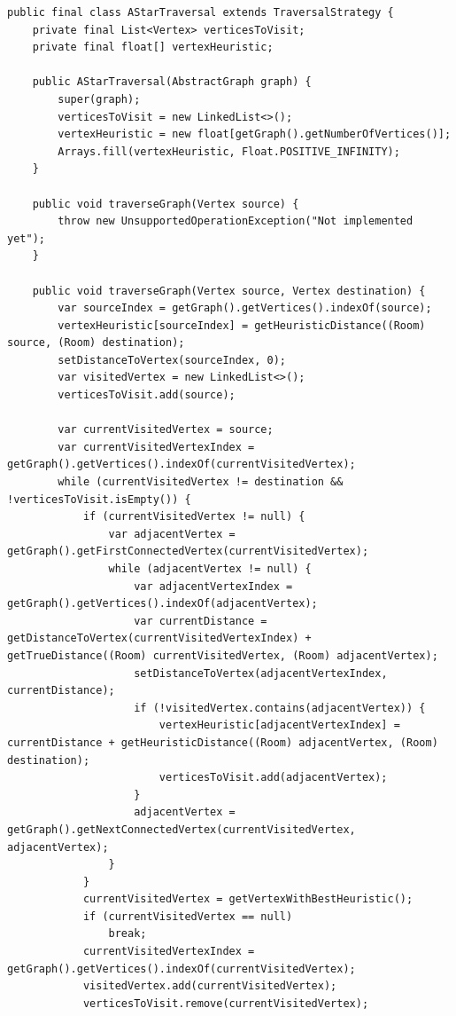 \documentclass[a4paper, 12pt]{article}
\begin{document}
\begin{verbatim}
public final class AStarTraversal extends TraversalStrategy {
    private final List<Vertex> verticesToVisit;
    private final float[] vertexHeuristic;

    public AStarTraversal(AbstractGraph graph) {
        super(graph);
        verticesToVisit = new LinkedList<>();
        vertexHeuristic = new float[getGraph().getNumberOfVertices()];
        Arrays.fill(vertexHeuristic, Float.POSITIVE_INFINITY);
    }

    public void traverseGraph(Vertex source) {
        throw new UnsupportedOperationException("Not implemented yet");
    }

    public void traverseGraph(Vertex source, Vertex destination) {
        var sourceIndex = getGraph().getVertices().indexOf(source);
        vertexHeuristic[sourceIndex] = getHeuristicDistance((Room) source, (Room) destination);
        setDistanceToVertex(sourceIndex, 0);
        var visitedVertex = new LinkedList<>();
        verticesToVisit.add(source);

        var currentVisitedVertex = source;
        var currentVisitedVertexIndex = getGraph().getVertices().indexOf(currentVisitedVertex);
        while (currentVisitedVertex != destination && !verticesToVisit.isEmpty()) {
            if (currentVisitedVertex != null) {
                var adjacentVertex = getGraph().getFirstConnectedVertex(currentVisitedVertex);
                while (adjacentVertex != null) {
                    var adjacentVertexIndex = getGraph().getVertices().indexOf(adjacentVertex);
                    var currentDistance = getDistanceToVertex(currentVisitedVertexIndex) + getTrueDistance((Room) currentVisitedVertex, (Room) adjacentVertex);
                    setDistanceToVertex(adjacentVertexIndex, currentDistance);
                    if (!visitedVertex.contains(adjacentVertex)) {
                        vertexHeuristic[adjacentVertexIndex] = currentDistance + getHeuristicDistance((Room) adjacentVertex, (Room) destination);
                        verticesToVisit.add(adjacentVertex);
                    }
                    adjacentVertex = getGraph().getNextConnectedVertex(currentVisitedVertex, adjacentVertex);
                }
            }
            currentVisitedVertex = getVertexWithBestHeuristic();
            if (currentVisitedVertex == null)
                break;
            currentVisitedVertexIndex = getGraph().getVertices().indexOf(currentVisitedVertex);
            visitedVertex.add(currentVisitedVertex);
            verticesToVisit.remove(currentVisitedVertex);


\end{verbatim}
\end{document}
